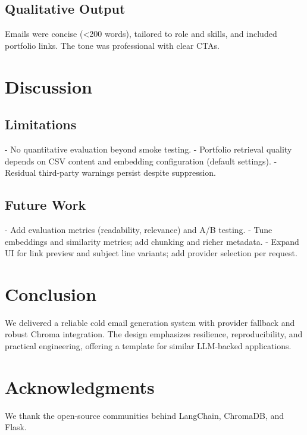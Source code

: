 \documentclass[conference]{IEEEtran}
\begin{document}
\subsection{Qualitative Output}
Emails were concise (\textless{}200 words), tailored to role and skills, and included portfolio links. The tone was professional with clear CTAs.

\section{Discussion}
\subsection{Limitations}
- No quantitative evaluation beyond smoke testing.
- Portfolio retrieval quality depends on CSV content and embedding configuration (default settings).
- Residual third-party warnings persist despite suppression.

\subsection{Future Work}
- Add evaluation metrics (readability, relevance) and A/B testing.
- Tune embeddings and similarity metrics; add chunking and richer metadata.
- Expand UI for link preview and subject line variants; add provider selection per request.

\section{Conclusion}
We delivered a reliable cold email generation system with provider fallback and robust Chroma integration. The design emphasizes resilience, reproducibility, and practical engineering, offering a template for similar LLM-backed applications.

\section*{Acknowledgments}
We thank the open-source communities behind LangChain, ChromaDB, and Flask.



\end{document}
